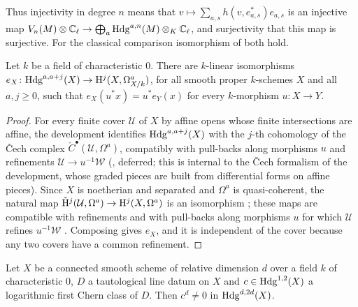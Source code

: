 Thus injectivity in degree $n$ means that $v\mapsto\sum_{a,s}h(v,e^*_{a,s})e_{a,s}$ is an injective map
$V_n(M)\otimes\mathbb{C}_\ell\to\bigoplus_a\mathrm{Hdg}^{a,n}(M)\otimes_K\mathbb{C}_\ell$, and surjectivity that this map is
surjective. For the classical comparison isomorphism of \cite{Faltings1988} both hold.

\begin{lemma}\label{pf:steps1:cech}
Let $k$ be a field of characteristic $0$. There are $k$-linear isomorphisms
$e_X\colon\mathrm{Hdg}^{a,a+j}(X)\to\mathrm{H}^j(X,\Omega^a_{X/k})$, for all smooth proper $k$-schemes $X$ and all $a,j\ge0$, such
that $e_X(u^*x)=u^*e_Y(x)$ for every $k$-morphism $u\colon X\to Y$.
\end{lemma}

\begin{proof}
For every finite cover $\mathcal U$ of $X$ by affine opens whose finite intersections are affine, the development
identifies $\mathrm{Hdg}^{a,a+j}(X)$ with the $j$-th cohomology of the \v{C}ech complex $\check C^\bullet(\mathcal U,\Omega^a)$,
compatibly with pull-backs along morphisms $u$ and refinements $\mathcal U\to u^{-1}\mathcal W$
(, deferred; this is internal to the \v{C}ech formalism of the
development, whose graded pieces are built from differential forms on affine pieces). Since $X$ is noetherian and
separated and $\Omega^a$ is quasi-coherent, the natural map $\check{\mathrm{H}}^j(\mathcal U,\Omega^a)\to\mathrm{H}^j(X,\Omega^a)$ is
an isomorphism \cite[III.4.5]{Hartshorne1977}; these maps are compatible with refinements and with pull-backs along
morphisms $u$ for which $\mathcal U$ refines $u^{-1}\mathcal W$ \cite[III.4.4]{Hartshorne1977}. Composing gives $e_X$, and
it is independent of the cover because any two covers have a common refinement.
\end{proof}

\begin{lemma}\label{pf:steps1:ktop}
Let $X$ be a connected smooth scheme of relative dimension $d$ over a field $k$ of characteristic $0$, $D$ a tautological
line datum on $X$ and $c\in\mathrm{Hdg}^{1,2}(X)$ a logarithmic first Chern class of $D$. Then $c^d\ne0$ in
$\mathrm{Hdg}^{d,2d}(X)$.
\end{lemma}

